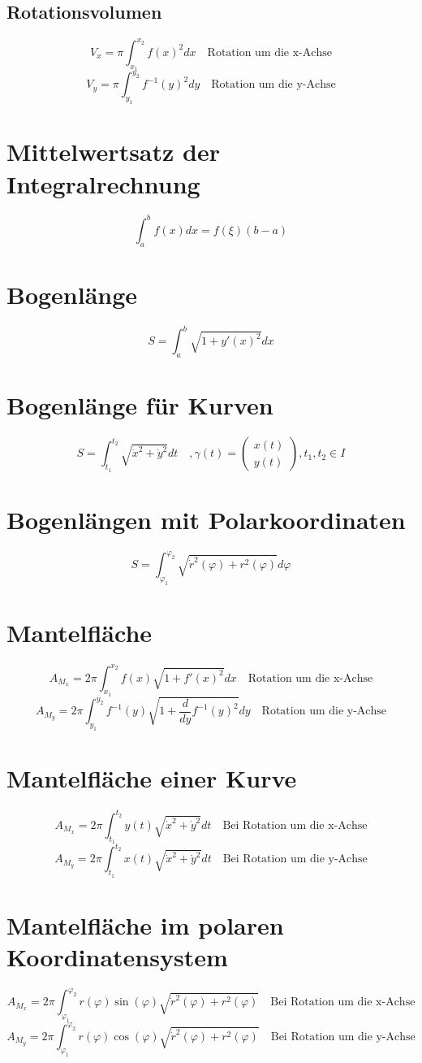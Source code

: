 \subsection{Rotationsvolumen}
\[ \boxed{V_x = \pi \int_{x_1}^{x_2} f(x)^2 dx} \quad \text{Rotation um die x-Achse}\]
\[ \boxed{V_y = \pi \int_{y_1}^{y_2} f^{-1}(y)^2 dy} \quad \text{Rotation um die y-Achse}\]

\section{Mittelwertsatz der Integralrechnung}
\[ \boxed{\int_{a}^{b} f(x) dx = f(\xi)(b-a)} \]

\section{Bogenlänge}
\[ \boxed{S = \int_{a}^{b} \sqrt{1 + y'(x)^2} dx} \]

\section{Bogenlänge für Kurven}
\[ \boxed{S = \int_{t_1}^{t_2}\sqrt{\dot{x}^2 + \dot{y}^2} dt \quad ,\gamma(t) = \left(\begin{matrix}x(t)\\y(t)\end{matrix}\right), t_1, t_2 \in I} \]

\section{Bogenlängen mit Polarkoordinaten}
\[ \boxed{S = \int_{\varphi_1}^{\varphi_2}\sqrt{\dot{r}^2(\varphi) + r^2(\varphi)}d\varphi} \]

\section{Mantelfläche}
\[ \boxed{A_{M_x} = 2 \pi \int_{x_1}^{x_2}f(x) \sqrt{1 + f'(x)^2} dx} \quad \text{Rotation um die x-Achse} \]
\[ \boxed{A_{M_y} = 2 \pi \int_{y_1}^{y_2}f^{-1}(y) \sqrt{1 + \frac{d}{dy}f^{-1}(y)^2} dy} \quad \text{Rotation um die y-Achse} \]

\section{Mantelfläche einer Kurve}
\[ \boxed{A_{M_x} = 2 \pi \int_{t_1}^{t_2} y(t) \sqrt{\dot{x}^2 + \dot{y}^2}dt} \quad \text{Bei Rotation um die x-Achse} \]
\[ \boxed{A_{M_y} = 2 \pi \int_{t_1}^{t_2} x(t) \sqrt{\dot{x}^2 + \dot{y}^2}dt} \quad \text{Bei Rotation um die y-Achse} \]

\section{Mantelfläche im polaren Koordinatensystem}
\[ \boxed{A_{M_x} = 2 \pi \int_{\varphi_1}^{\varphi_2}r(\varphi) \sin(\varphi)\sqrt{\dot{r}^2(\varphi) + r^2(\varphi)}} \quad \text{Bei Rotation um die x-Achse} \]
\[ \boxed{A_{M_y} = 2 \pi \int_{\varphi_1}^{\varphi_2}r(\varphi) \cos(\varphi)\sqrt{\dot{r}^2(\varphi) + r^2(\varphi)}} \quad \text{Bei Rotation um die y-Achse} \]
